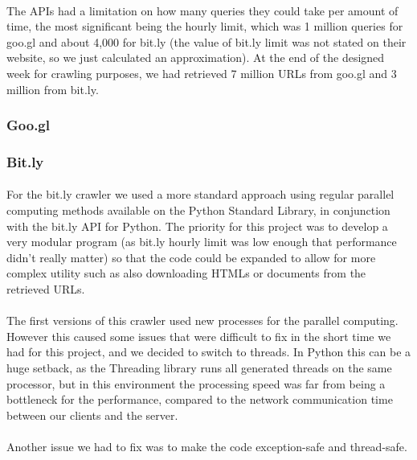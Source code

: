 \documentclass[12pt]{article}
\begin{document}
\paragraph{}
The APIs had a limitation on how many queries they could take per amount of time, the most significant being the hourly limit, which was 1 million queries for goo.gl and about 4,000 for bit.ly (the value of bit.ly limit was not stated on their website, so we just calculated an approximation). At the end of the designed week for crawling purposes, we had retrieved 7 million URLs from goo.gl and 3 million from bit.ly.

\subsubsection{Goo.gl}

\subsubsection{Bit.ly}

\paragraph{}
For the bit.ly crawler we used a more standard approach using regular parallel computing methods available on the Python Standard Library, in conjunction with the bit.ly API for Python. The priority for this project was to develop a very modular program (as bit.ly hourly limit was low enough that performance didn't really matter) so that the code could be expanded to allow for more complex utility such as also downloading HTMLs or documents from the retrieved URLs.

\paragraph{}
The first versions of this crawler used new processes for the parallel computing. However this caused some issues that were difficult to fix in the short time we had for this project, and we decided to switch to threads. In Python this can be a huge setback, as the Threading library runs all generated threads on the same processor, but in this environment the processing speed was far from being a bottleneck for the performance, compared to the network communication time between our clients and the server.

\paragraph{}
Another issue we had to fix was to make the code exception-safe and thread-safe.
\end{document}

